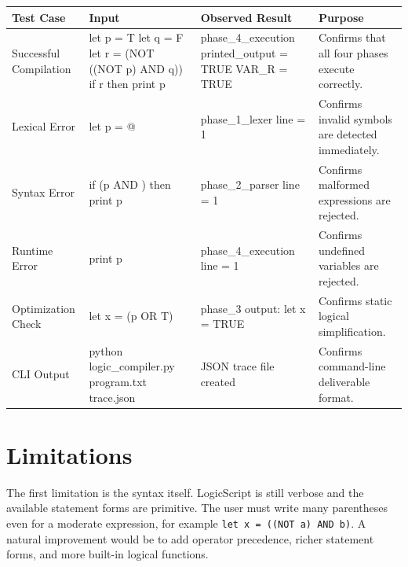 \documentclass[10pt]{article}
\begin{document}
\begin{center}
\begin{tabular}{L{0.20\textwidth} L{0.30\textwidth} L{0.24\textwidth} L{0.18\textwidth}}
\toprule
\textbf{Test Case} & \textbf{Input} & \textbf{Observed Result} & \textbf{Purpose} \\
\midrule
Successful Compilation & \ttfamily let p = T \newline let q = F \newline let r = (NOT ((NOT p) AND q)) \newline if r then print p & \ttfamily phase\_4\_execution \newline printed\_output = TRUE \newline VAR\_R = TRUE & Confirms that all four phases execute correctly. \\
Lexical Error & \ttfamily let p = @ & \ttfamily phase\_1\_lexer \newline line = 1 & Confirms invalid symbols are detected immediately. \\
Syntax Error & \ttfamily if (p AND ) then print p & \ttfamily phase\_2\_parser \newline line = 1 & Confirms malformed expressions are rejected. \\
Runtime Error & \ttfamily print p & \ttfamily phase\_4\_execution \newline line = 1 & Confirms undefined variables are rejected. \\
Optimization Check & \ttfamily let x = (p OR T) & \ttfamily phase\_3 output: \newline let x = TRUE & Confirms static logical simplification. \\
CLI Output & \ttfamily python logic\_compiler.py program.txt trace.json & \ttfamily JSON trace file created & Confirms command-line deliverable format. \\
\bottomrule
\end{tabular}
\end{center}

\section{Limitations}
The first limitation is the syntax itself. LogicScript is still verbose and the available statement forms are primitive. The user must write many parentheses even for a moderate expression, for example \texttt{let x = ((NOT a) AND b)}. A natural improvement would be to add operator precedence, richer statement forms, and more built-in logical functions.
\end{document}
